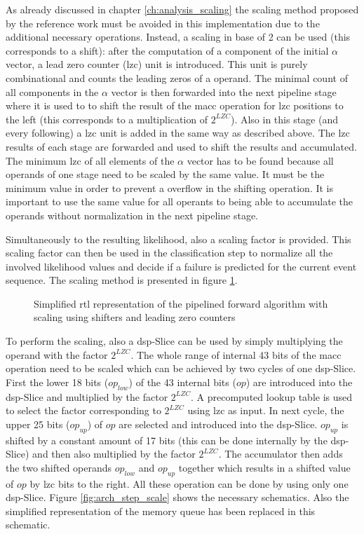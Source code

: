 \documentclass[mscthesis]{usiinfthesis}
\begin{document}
As already discussed in chapter \ref{ch:analysis_scaling} the scaling method
proposed by the reference work must be avoided in this implementation due to
the additional necessary operations. Instead, a scaling in base of 2 can be
used (this corresponds to a shift): after the computation of a component of the
initial $\alpha$ vector, a lead zero counter (\gls{lzc}) unit is introduced. This
unit is purely combinational and counts the leading zeros of a operand. The
minimal count of all components in the $\alpha$ vector is then forwarded into
the next pipeline stage where it is used to to shift the result of the \gls{macc}
operation for \gls{lzc} positions to the left (this corresponds to a multiplication
of $2^{LZC}$). Also in this stage (and every following) a \gls{lzc} unit is added in
the same way as described above. The \gls{lzc} results of each stage are forwarded
and used to shift the results and accumulated. The minimum \gls{lzc} of all elements
of the $\alpha$ vector has to be found because all operands of one stage need
to be scaled by the same value. It must be the minimum value in order to
prevent a overflow in the shifting operation. It is important to use the same
value for all operants to being able to accumulate the operands without
normalization in the next pipeline stage.

Simultaneously to the resulting likelihood, also a scaling factor is provided.
This scaling factor can then be used in the classification step to normalize
all the involved likelihood values and decide if a failure is predicted for the
current event sequence. The scaling method is presented in figure
\ref{fig:arch_pipe_scale}.

\begin{figure}
    \centering
    
    \caption{Simplified \acrshort{rtl} representation of the pipelined forward algorithm
        with scaling using shifters and leading zero counters}
    \label{fig:arch_pipe_scale}
\end{figure}

To perform the scaling, also a \gls{dsp}-Slice can be used by simply multiplying the
operand with the factor $2^{LZC}$. The whole range of internal 43 bits of the
\gls{macc} operation need to be scaled which can be achieved by two cycles of one
\gls{dsp}-Slice. First the lower 18 bits ($op_{low}$) of the 43 internal bits ($op$)
are introduced into the \gls{dsp}-Slice and multiplied by the factor $2^{LZC}$.
A precomputed lookup table is used to select the factor corresponding to
$2^{LZC}$ using \gls{lzc} as input. In next cycle, the upper 25 bits ($op_{up}$) of
$op$ are selected and introduced into the \gls{dsp}-Slice. $op_{up}$ is shifted by
a constant amount of 17 bits (this can be done internally by the \gls{dsp}-Slice) and
then also multiplied by the factor $2^{LZC}$. The accumulator then adds the two
shifted operands $op_{low}$ and $op_{up}$ together which results in a shifted
value of $op$ by \gls{lzc} bits to the right. All these operation can be done by
using only one \gls{dsp}-Slice. Figure \ref{fig:arch_step_scale} shows the necessary
schematics. Also the simplified representation of the memory queue has been
replaced in this schematic.
\end{document}
